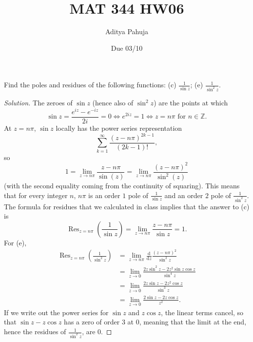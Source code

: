 \documentclass[10pt]{article}
\title{MAT 344 HW06}
\author{\large Aditya Pahuja}
\date{\large Due 03/10}
\newcommand{\dd}{\mathrm{d}}
\providecommand{\ZZ}{\mathbb Z}
\newenvironment{soln}{\begin{proof}[Solution]}{\end{proof}}
\begin{document}
\maketitle

\begin{problem}
    [p.161\#1ce]
    Find the poles and residues of the following functions:
    (c) $\frac 1{\sin z}$; (e) $\frac 1{\sin^2z}$.
\end{problem}

\begin{soln}
    The zeroes of $\sin z$ (hence also of $\sin^2 z$)
    are the points at which
    \begin{equation*}
	\sin z = \frac{e^{iz} - e^{-iz}}{2i} = 0
	\iff e^{2iz} = 1
	\iff z = n\pi\text{ for }n\in\ZZ.
    \end{equation*}
    At $z = n\pi$, $\sin z$ locally has the power series representation
    \begin{equation*}
	\sum_{k=1}^\infty \frac{(z-n\pi)^{2k-1}}{(2k-1)!},
    \end{equation*}
    so
    \begin{equation*}
	1 = \lim_{z\to n\pi} \frac{z-n\pi}{\sin(z)} =
	\lim_{z\to n\pi} \frac{(z-n\pi)^2}{\sin^2(z)}
    \end{equation*}
    (with the second equality coming from
    the continuity of squaring).
    This means that for every integer $n$, $n\pi$ is an order $1$ pole of
    $\frac 1{\sin z}$ and an order $2$ pole of $\frac 1{\sin^2z}$.
    The formula for residues that we calculated in class
    implies that the answer to (c) is
    \begin{equation*}
	\operatorname{Res}_{z=n\pi}\left(\frac 1{\sin z}\right)
	= \lim_{z\to n\pi}\frac{z-n\pi}{\sin z} = \boxed 1.
    \end{equation*}
    For (e),
    \begin{align*}
	\operatorname{Res}_{z=n\pi}\left(\frac 1{\sin^2 z}\right)
	&= \lim_{z\to n\pi}
	\frac{\dd}{\dd z}\frac{(z-n\pi)^2}{\sin^2 z}\\
	&= \lim_{z\to 0} \frac{2z\sin^2 z - 2z^2\sin z\cos z}{\sin^4z}\\
	&= \lim_{z\to 0} \frac{2z\sin z - 2z^2\cos z}{\sin^3z}\\
	&= \lim_{z\to 0} \frac{2\sin z - 2z\cos z}{z^2}.
    \end{align*}
    If we write out the power series for $\sin z$
    and $z\cos z$, the linear terms cancel,
    so that $\sin z - z\cos z$ has a zero of order $3$ at $0$,
    meaning that the limit at the end,
    hence the residues of $\frac 1{\sin^2z}$, are $\boxed 0$.
\end{soln}
\end{document}
